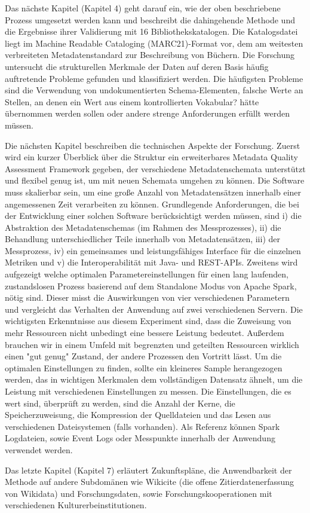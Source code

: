 Das nächste Kapitel (Kapitel 4) geht darauf ein, wie der oben beschriebene Prozess umgesetzt werden kann und beschreibt die dahingehende Methode und die Ergebnisse ihrer Validierung mit 16 Bibliothekskatalogen. Die Katalogsdatei liegt im Machine Readable Cataloging (MARC21)-Format vor, dem am weitesten verbreiteten Metadatenstandard zur Beschreibung von Büchern. Die Forschung untersucht die strukturellen Merkmale der Daten auf deren Basis häufig auftretende Probleme gefunden und klassifiziert werden. Die häufigsten Probleme sind die Verwendung von undokumentierten Schema-Elementen, falsche Werte an Stellen, an denen ein Wert aus einem kontrollierten Vokabular? hätte übernommen werden sollen oder andere strenge Anforderungen erfüllt werden müssen.

Die nächsten Kapitel beschreiben die technischen Aspekte der Forschung. Zuerst wird ein kurzer Überblick über die Struktur ein erweiterbares Metadata Quality Assessment Framework gegeben, der verschiedene Metadatenschemata unterstützt und flexibel genug ist, um mit neuen Schemata umgehen zu können. Die Software muss skalierbar sein, um eine große Anzahl von Metadatensätzen innerhalb einer angemessenen Zeit verarbeiten zu können. Grundlegende Anforderungen, die bei der Entwicklung einer solchen Software berücksichtigt werden müssen, sind i) die Abstraktion des Metadatenschemas (im Rahmen des Messprozesses), ii) die Behandlung unterschiedlicher Teile innerhalb von Metadatensätzen, iii) der Messprozess, iv) ein gemeinsames und leistungsfähiges Interface für die einzelnen Metriken und v) die Interoperabilität mit Java- und REST-APIs. Zweitens wird aufgezeigt welche optimalen Parametereinstellungen für einen lang laufenden, zustandslosen Prozess basierend auf dem Standalone Modus von Apache Spark, nötig sind. Dieser misst die Auswirkungen von vier verschiedenen Parametern und vergleicht das Verhalten der Anwendung auf zwei verschiedenen Servern. Die wichtigsten Erkenntnisse aus diesem Experiment sind, dass die Zuweisung von mehr Ressourcen nicht unbedingt eine bessere Leistung bedeutet. Außerdem brauchen wir in einem Umfeld mit begrenzten und geteilten Ressourcen wirklich einen "gut genug" Zustand, der andere Prozessen den Vortritt lässt. Um die optimalen Einstellungen zu finden, sollte ein kleineres Sample herangezogen werden, das in wichtigen Merkmalen dem vollständigen Datensatz ähnelt, um die Leistung mit verschiedenen Einstellungen zu messen. Die Einstellungen, die es wert sind, überprüft zu werden, sind die Anzahl der Kerne, die Speicherzuweisung, die Kompression der Quelldateien und das Lesen aus verschiedenen Dateisystemen (falls vorhanden). Als Referenz können Spark Logdateien, sowie Event Logs oder Messpunkte innerhalb der Anwendung verwendet werden.

Das letzte Kapitel (Kapitel 7) erläutert Zukunftspläne, die Anwendbarkeit der Methode auf andere Subdomänen wie Wikicite (die offene Zitierdatenerfassung von Wikidata) und Forschungsdaten, sowie Forschungskooperationen mit verschiedenen Kulturerbeinstitutionen.
